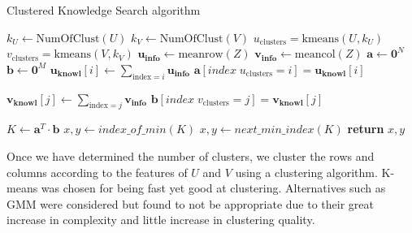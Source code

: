 \begin{algorithm}
\caption{Clustered Knowledge Search algorithm}\label{alg:cks}
\begin{algorithmic}[1]
\State $k_U \gets \text{NumOfClust}(U)$ 
\State $k_V \gets \text{NumOfClust}(V)$
\State $u_{\text{clusters}} = \text{kmeans}(U,k_U)$ 
\State $v_{\text{clusters}} = \text{kmeans}(V,k_V)$
\State $\mathbf{u_{info}} \gets \text{meanrow}(Z)$ 
\State $\mathbf{v_{info}} \gets \text{meancol}(Z)$ 
\State $\mathbf{a} \gets \mathbf{0}^{N}$ 
\State $\mathbf{b} \gets \mathbf{0}^{M}$ 
\State $\mathbf{u_{knowl}}[i] \gets \sum\limits_{\text{index}=i} \mathbf{u_{info}}$ 
\State $\mathbf{a}[{index\; u_{\text{clusters}} =i}] = \mathbf{u_{knowl}}[i]$ 
\EndFor

\State $\mathbf{v_{knowl}}[j] \gets \sum\limits_{\text{index}=j} \mathbf{v_{info}}$
\State $\mathbf{b}[{index\; v_{\text{clusters}} =j}] = \mathbf{v_{knowl}}[j]$
\EndFor

\State $K \gets \mathbf{a}^T \cdot \mathbf{b}$ 
\State $x,y \gets index\_of\_min(K)$  \label{alg:line:select}
\State $x,y \gets next\_min\_index(K)$
\EndWhile
\State \textbf{return} $x,y$
\EndProcedure
\end{algorithmic}
\end{algorithm}

Once we have determined the number of clusters, we cluster the rows and columns according to the features of $U$ and $V$ using a clustering algorithm. K-means was chosen for being fast yet good at clustering. Alternatives such as GMM were considered but found to not be appropriate due to their great increase in complexity and little increase in clustering quality.




